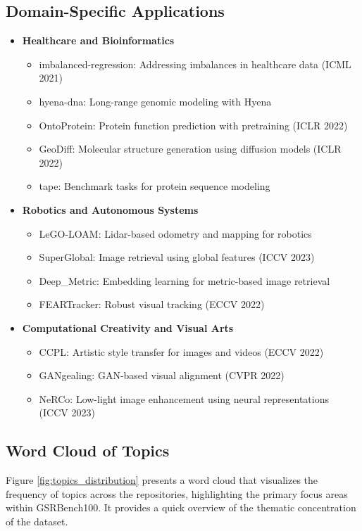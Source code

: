 \subsection*{Domain-Specific Applications}
\begin{itemize}
    \item \textbf{Healthcare and Bioinformatics}
    \begin{itemize}
        \item imbalanced-regression: Addressing imbalances in healthcare data (ICML 2021)
        \item hyena-dna: Long-range genomic modeling with Hyena
        \item OntoProtein: Protein function prediction with pretraining (ICLR 2022)
        \item GeoDiff: Molecular structure generation using diffusion models (ICLR 2022)
        \item tape: Benchmark tasks for protein sequence modeling
    \end{itemize}
    \item \textbf{Robotics and Autonomous Systems}
    \begin{itemize}
        \item LeGO-LOAM: Lidar-based odometry and mapping for robotics
        \item SuperGlobal: Image retrieval using global features (ICCV 2023)
        \item Deep\_Metric: Embedding learning for metric-based image retrieval
        \item FEARTracker: Robust visual tracking (ECCV 2022)
    \end{itemize}
    \item \textbf{Computational Creativity and Visual Arts}
    \begin{itemize}
        \item CCPL: Artistic style transfer for images and videos (ECCV 2022)
        \item GANgealing: GAN-based visual alignment (CVPR 2022)
        \item NeRCo: Low-light image enhancement using neural representations (ICCV 2023)
    \end{itemize}
\end{itemize}

\subsection{Word Cloud of Topics}
Figure \ref{fig:topics_distribution} presents a word cloud that visualizes the frequency of topics across the repositories, highlighting the primary focus areas within GSRBench100. It provides a quick overview of the thematic concentration of the dataset.




